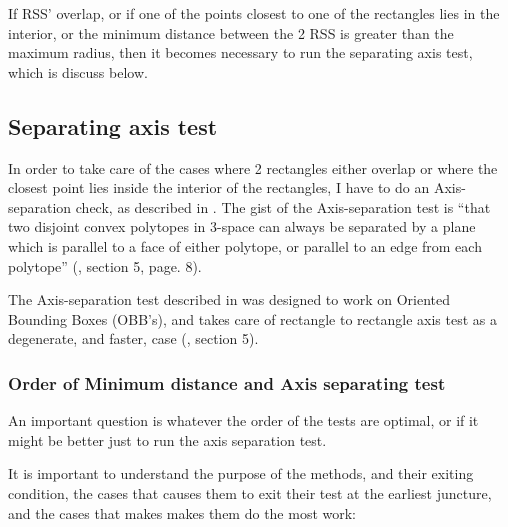 If RSS' overlap, or if one of the points closest to one of the rectangles lies in the interior, or the minimum distance between the 2 RSS is greater than the maximum radius, then it becomes necessary to run the separating axis test, which is discuss below.

\subsection{Separating axis test}
\label{sepAxis}
In order to take care of the cases where 2 rectangles either overlap or where the closest point lies inside the interior of the rectangles, I have to do an Axis-separation check, as described in \cite{237244}. The gist of the Axis-separation test is ``that two disjoint convex polytopes in 3-space can always be separated by a plane which is parallel to a face of either polytope, or parallel to an edge from each polytope'' (\cite{237244}, section 5, page. 8).

The Axis-separation test described in \cite{237244} was designed to work on Oriented Bounding Boxes (OBB's), and takes care of rectangle to rectangle axis test as a degenerate, and faster, case (\cite{237244}, section 5). 


\subsubsection{Order of Minimum distance and Axis separating test}
\label{minAxisOrder}
An important question is whatever the order of the tests are optimal, or if it might be better just to run the axis separation test.

It is important to understand the purpose of the methods, and their exiting condition, the cases that causes them to exit their test at the earliest juncture, and the cases that makes makes them do the most work:

